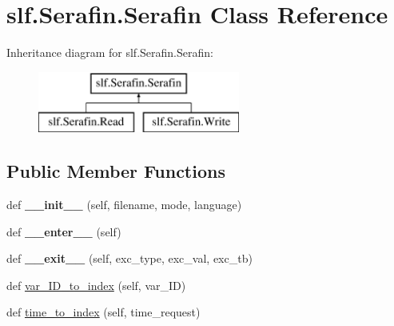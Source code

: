 \hypertarget{classslf_1_1_serafin_1_1_serafin}{}\section{slf.\+Serafin.\+Serafin Class Reference}
\label{classslf_1_1_serafin_1_1_serafin}
Inheritance diagram for slf.\+Serafin.\+Serafin\+:\begin{figure}[H]
\begin{center}
\leavevmode
\includegraphics[height=2.000000cm]{classslf_1_1_serafin_1_1_serafin}
\end{center}
\end{figure}
\subsection*{Public Member Functions}
\begin{DoxyCompactItemize}
\item 
def {\bfseries \+\_\+\+\_\+init\+\_\+\+\_\+} (self, filename, mode, language)\hypertarget{classslf_1_1_serafin_1_1_serafin_a6241f465ff9a20e53282a329e01622e0}{}\label{classslf_1_1_serafin_1_1_serafin_a6241f465ff9a20e53282a329e01622e0}

\item 
def {\bfseries \+\_\+\+\_\+enter\+\_\+\+\_\+} (self)\hypertarget{classslf_1_1_serafin_1_1_serafin_a36d16a6d9ece9fb1784fe34c661f1df1}{}\label{classslf_1_1_serafin_1_1_serafin_a36d16a6d9ece9fb1784fe34c661f1df1}

\item 
def {\bfseries \+\_\+\+\_\+exit\+\_\+\+\_\+} (self, exc\+\_\+type, exc\+\_\+val, exc\+\_\+tb)\hypertarget{classslf_1_1_serafin_1_1_serafin_ae0298563155b529b8c8c79bd22c328d9}{}\label{classslf_1_1_serafin_1_1_serafin_ae0298563155b529b8c8c79bd22c328d9}

\item 
def \hyperlink{classslf_1_1_serafin_1_1_serafin_a28ad3a33ff8df189fd3255ce1dd47aea}{var\+\_\+\+I\+D\+\_\+to\+\_\+index} (self, var\+\_\+\+ID)
\item 
def \hyperlink{classslf_1_1_serafin_1_1_serafin_accd09be282a9f5285e51475e05087d87}{time\+\_\+to\+\_\+index} (self, time\+\_\+request)
\end{DoxyCompactItemize}
